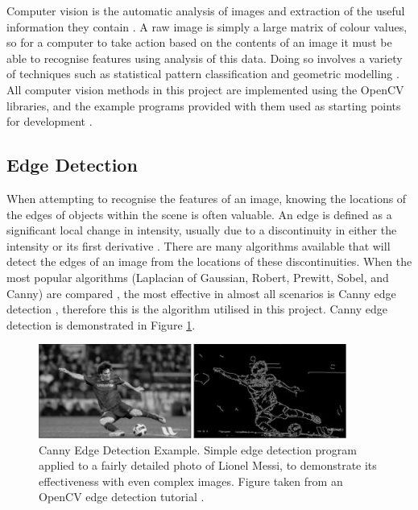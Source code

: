 Computer vision is the automatic analysis of images and extraction of the useful information they contain \cite{CVDef}. A raw image is simply a large matrix of colour values, so for a computer to take action based on the contents of an image it must be able to recognise features using analysis of this data. Doing so involves a variety of techniques such as statistical pattern classification and geometric modelling \cite{ballard1982computer}. All computer vision methods in this project are implemented using the OpenCV libraries, and the example programs provided with them used as starting points for development \cite{OpenCV}.

\subsection{Edge Detection}
When attempting to recognise the features of an image, knowing the locations of the edges of objects within the scene is often valuable. An edge is defined as a significant local change in intensity, usually due to a discontinuity in either the intensity or its first derivative \cite{jain1995machine}. There are many algorithms available that will detect the edges of an image from the locations of these discontinuities. When the most popular algorithms (Laplacian of Gaussian, Robert, Prewitt, Sobel, and Canny) are compared \cite{maini2009study}, the most effective in almost all scenarios is Canny edge detection \cite{canny1986computational}, therefore this is the algorithm utilised in this project. Canny edge detection is demonstrated in Figure \ref{fig:canny1}.

\begin{figure}[H]
    \begin{center}
      \includegraphics[width=0.9\textwidth]{Figures/canny2.png}
      \caption[Canny Edge Detection Example]{Canny Edge Detection Example. Simple edge detection program applied to a fairly detailed photo of Lionel Messi, to demonstrate its effectiveness with even complex images. Figure taken from an OpenCV edge detection tutorial \cite{Canny1Source}.}
      \label{fig:canny1}
    \end{center}
\end{figure}

